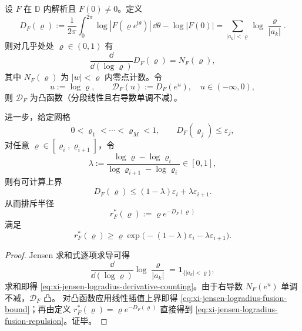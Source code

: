 \begin{proposition}\label{prop:xi-jensen-logradius-convex-fusion}
设 \(F\) 在 \(\mathbb D\) 内解析且 \(F(0)\neq 0\)。定义
\[
D_F(\varrho):=\frac1{2\pi}\int_0^{2\pi}\log|F(\varrho e^{\mathrm{i}\theta})|\,\dd\theta-\log|F(0)|
=\sum_{|a_k|<\varrho}\log\frac{\varrho}{|a_k|}.
\]
则对几乎处处 \(\varrho\in(0,1)\) 有
\begin{equation}\label{eq:xi-jensen-logradius-derivative-counting}
\frac{\dd}{\dd(\log\varrho)}D_F(\varrho)=N_F(\varrho),
\end{equation}
其中 \(N_F(\varrho)\) 为 \(|w|<\varrho\) 内零点计数。令
\[
u:=\log\varrho,\qquad
\mathcal D_F(u):=D_F(e^u),\quad u\in(-\infty,0),
\]
则 \(\mathcal D_F\) 为凸函数（分段线性且右导数单调不减）。

进一步，给定网格
\[
0<\varrho_1<\cdots<\varrho_M<1,\qquad
D_F(\varrho_j)\le \varepsilon_j,
\]
对任意 \(\varrho\in[\varrho_i,\varrho_{i+1}]\)，令
\[
\lambda:=\frac{\log\varrho-\log\varrho_i}{\log\varrho_{i+1}-\log\varrho_i}\in[0,1],
\]
则有可计算上界
\begin{equation}\label{eq:xi-jensen-logradius-fusion-bound}
D_F(\varrho)\le (1-\lambda)\varepsilon_i+\lambda\varepsilon_{i+1}.
\end{equation}
从而排斥半径
\[
r_F^\ast(\varrho):=\varrho e^{-D_F(\varrho)}
\]
满足
\begin{equation}\label{eq:xi-jensen-logradius-fusion-repulsion}
r_F^\ast(\varrho)\ge
\varrho\exp\!\bigl(-(1-\lambda)\varepsilon_i-\lambda\varepsilon_{i+1}\bigr).
\end{equation}
\end{proposition}
\begin{proof}
Jensen 求和式逐项求导可得
\[
\frac{\dd}{\dd(\log\varrho)}\log\frac{\varrho}{|a_k|}
=\mathbf 1_{\{|a_k|<\varrho\}},
\]
求和即得 \eqref{eq:xi-jensen-logradius-derivative-counting}。由于右导数 \(N_F(e^u)\) 单调不减，\(\mathcal D_F\) 凸。
对凸函数应用线性插值上界即得 \eqref{eq:xi-jensen-logradius-fusion-bound}；再由定义
\(
r_F^\ast(\varrho)=\varrho e^{-D_F(\varrho)}
\)
直接得到 \eqref{eq:xi-jensen-logradius-fusion-repulsion}。证毕。
\end{proof}

